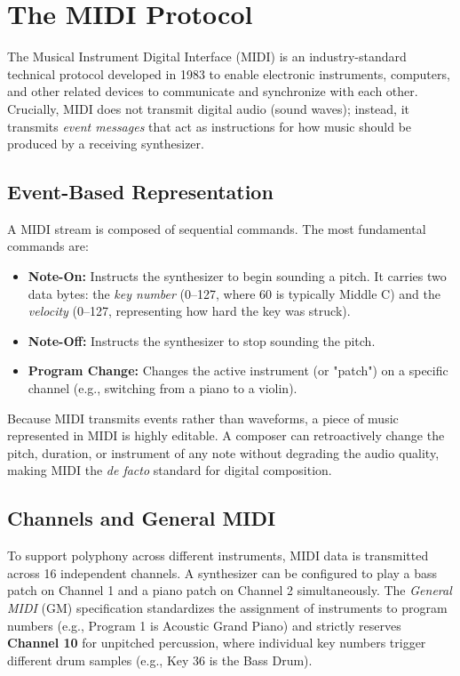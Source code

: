 \section{The MIDI Protocol}\label{sec:background-midi}

The Musical Instrument Digital Interface (MIDI) is an industry-standard technical protocol developed in 1983
to enable electronic instruments, computers, and other related devices to communicate and synchronize with each other.
Crucially, MIDI does not transmit digital audio (sound waves); instead, it transmits \textit{event messages}
that act as instructions for how music should be produced by a receiving synthesizer.

\subsection{Event-Based Representation}

A MIDI stream is composed of sequential commands. The most fundamental commands are:
\begin{itemize}
  \item \textbf{Note-On:} Instructs the synthesizer to begin sounding a pitch. It carries two data bytes: the
    \textit{key number} (0--127, where 60 is typically Middle C) and the \textit{velocity} (0--127,
    representing how hard the key was struck).
  \item \textbf{Note-Off:} Instructs the synthesizer to stop sounding the pitch.
  \item \textbf{Program Change:} Changes the active instrument (or "patch") on a specific channel (e.g.,
    switching from a piano to a violin).
\end{itemize}

Because MIDI transmits events rather than waveforms, a piece of music represented in MIDI is highly editable.
A composer can retroactively change the pitch, duration, or instrument of any note without degrading the
audio quality, making MIDI the \textit{de facto} standard for digital composition.

\subsection{Channels and General MIDI}

To support polyphony across different instruments, MIDI data is transmitted across 16 independent channels.
A synthesizer can be configured to play a bass patch on Channel 1 and a piano patch on Channel 2 simultaneously.
The \textit{General MIDI} (GM) specification standardizes the assignment of instruments to program numbers
(e.g., Program 1 is Acoustic Grand Piano) and strictly reserves \textbf{Channel 10} for unpitched percussion,
where individual key numbers trigger different drum samples (e.g., Key 36 is the Bass Drum).

